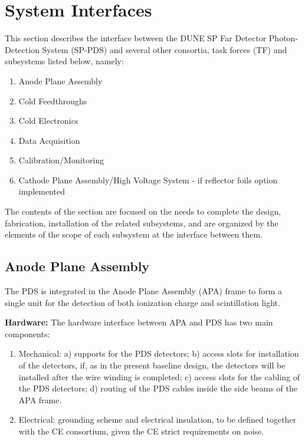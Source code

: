 \section{System Interfaces}
\label{sec:fdsp-pd-intfc}



This section describes the interface between the DUNE SP Far Detector Photon-Detection System (SP-PDS) and several other consortia, task forces (TF) and subsystems listed below, namely:

\begin{enumerate}
\item Anode Plane Assembly
\item{Cold Feedthroughs}
\item Cold Electronics
\item Data Acquisition
\item Calibration/Monitoring
\item{Cathode Plane Assembly/High Voltage System - if reflector foils option implemented}
\end{enumerate}

The contents of the section are focused on the needs to complete the design, fabrication, installation of the related subsystems, and are organized by the elements of the scope of each subsystem at the interface between them.
\subsection{Anode Plane Assembly}
\label{sec:fdsp-pd-intfc-apa}
The PDS is integrated in the Anode Plane Assembly (APA) frame to form a single unit for the detection of both ionization charge and scintillation light.

\textbf{Hardware:}
The hardware interface between APA and PDS has two main components:
\begin{enumerate}
\item Mechanical: a) supports for the PDS detectors; b) access slots for installation of the detectors, if, as in the present baseline design, the detectors will be installed after the wire winding is completed; c) access slots for the cabling of the PDS detectors; d) routing of the PDS cables inside the side beams of the APA frame.
\item Electrical: grounding scheme and electrical insulation, to be defined together with the CE consortium, given the CE strict requirements on noise.
\end{enumerate}


